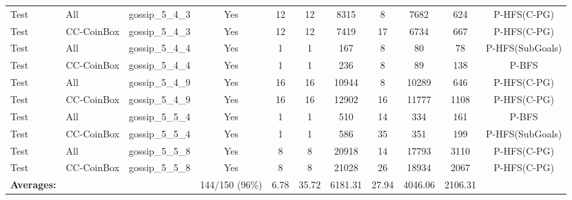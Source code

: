 \documentclass{article}
\begin{document}
\begin{tabular}{lllcccccccc}
Test & All & gossip\_5\_4\_3 & Yes & 12 & 12 & 8315 & 8 & 7682 & 624 & P-HFS(C-PG) \\
Test & CC-CoinBox & gossip\_5\_4\_3 & Yes & 12 & 12 & 7419 & 17 & 6734 & 667 & P-HFS(C-PG) \\
Test & All & gossip\_5\_4\_4 & Yes & 1 & 1 & 167 & 8 & 80 & 78 & P-HFS(SubGoals) \\
Test & CC-CoinBox & gossip\_5\_4\_4 & Yes & 1 & 1 & 236 & 8 & 89 & 138 & P-BFS \\
Test & All & gossip\_5\_4\_9 & Yes & 16 & 16 & 10944 & 8 & 10289 & 646 & P-HFS(C-PG) \\
Test & CC-CoinBox & gossip\_5\_4\_9 & Yes & 16 & 16 & 12902 & 16 & 11777 & 1108 & P-HFS(C-PG) \\
Test & All & gossip\_5\_5\_4 & Yes & 1 & 1 & 510 & 14 & 334 & 161 & P-BFS \\
Test & CC-CoinBox & gossip\_5\_5\_4 & Yes & 1 & 1 & 586 & 35 & 351 & 199 & P-HFS(SubGoals) \\
Test & All & gossip\_5\_5\_8 & Yes & 8 & 8 & 20918 & 14 & 17793 & 3110 & P-HFS(C-PG) \\
Test & CC-CoinBox & gossip\_5\_5\_8 & Yes & 8 & 8 & 21028 & 26 & 18934 & 2067 & P-HFS(C-PG) \\
\textbf{Averages:} & & & 144/150 (96\%) & 6.78 & 35.72 & 6181.31 & 27.94 & 4046.06 & 2106.31 & \\
\bottomrule
\end{tabular}
\newpage
\end{document}

